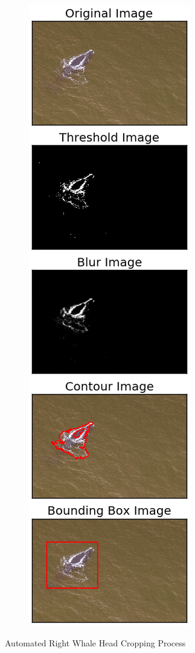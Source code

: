 \begin{figure}[H]
\begin{subfigure}[b]{0.25\linewidth}
		\caption{}
	\end{subfigure}
	\begin{subfigure}[b]{0.2515\linewidth}
		\includegraphics[width=\linewidth]{sections/imgs/preprocessing/figure_3.png}
		\caption{}
	\end{subfigure}
	
	\caption{Automated Right Whale Head Cropping Process}
	\label{fig:auto_head_croper}
\end{figure}

